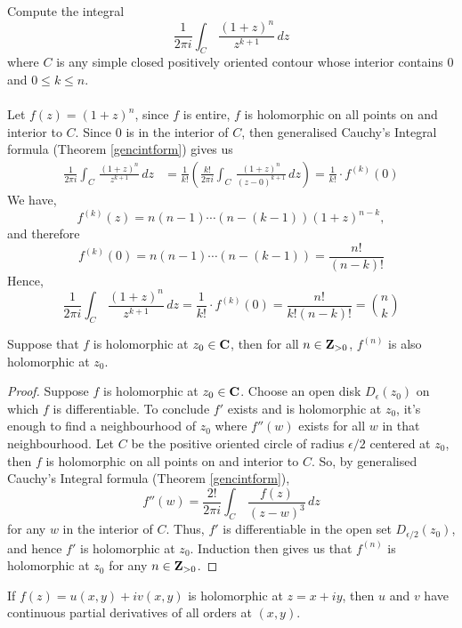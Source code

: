 \medskip

\begin{example}
Compute the integral
\[\frac{1}{2\pi i}\int_C\,\frac{(1 + z)^n}{z^{k+1}}\,dz\]
where $C$ is any simple closed positively oriented contour whose interior contains $0$ and $0 \leq k \leq n$.\\
\\
Let $f(z) = (1 + z)^n$, since $f$ is entire, $f$ is holomorphic on all points on and interior to $C$. Since $0$ is in the interior of $C$, then generalised Cauchy's Integral formula (Theorem \ref{gencintform}) gives us
\begin{align*}
\frac{1}{2\pi i}\int_C\,\frac{(1 + z)^n}{z^{k+1}}\,dz &= \frac{1}{k!}\left(\frac{k!}{2\pi i}\int_C\,\frac{(1 + z)^n}{(z - 0)^{k+1}}\,dz\right) = \frac{1}{k!}\cdot f^{(k)}(0)
\end{align*}
We have, 
\[f^{(k)}(z) = n(n-1)\cdots (n-(k-1))(1 + z)^{n-k},\]
and therefore
\[f^{(k)}(0) = n(n-1)\cdots (n-(k-1)) = \frac{n!}{(n-k)!}\]
Hence, 
\[\frac{1}{2\pi i}\int_C\,\frac{(1 + z)^n}{z^{k+1}}\,dz = \frac{1}{k!}\cdot f^{(k)}(0) = \frac{n!}{k!(n-k)!} = \binom{n}{k}\]
\end{example}

\medskip

\begin{theorem}\label{holsmooth}
Suppose that $f$ is holomorphic at $z_0 \in \mathbf C$, then for all $n\in \mathbf Z_{>0}$, $f^{(n)}$ is also holomorphic at $z_0$. 
\end{theorem}
\begin{proof}
Suppose $f$ is holomorphic at $z_0 \in \mathbf C$. Choose an open disk $D_\epsilon(z_0)$ on which $f$ is differentiable. To conclude $f'$ exists and is holomorphic at $z_0$, it's enough to find a neighbourhood of $z_0$ where $f''(w)$ exists for all $w$ in that neighbourhood. Let $C$ be the positive oriented circle of radius $\epsilon/2$ centered at $z_0$, then $f$ is holomorphic on all points on and interior to $C$. So, by generalised Cauchy's Integral formula (Theorem \ref{gencintform}),
\[f''(w) = \frac{2!}{2\pi i}\int_C\,\frac{f(z)}{(z - w)^3}\,dz\]
for any $w$ in the interior of $C$. Thus, $f'$ is differentiable in the open set $D_{\epsilon/2}(z_0)$, and hence $f'$ is holomorphic at $z_0$. Induction then gives us that $f^{(n)}$ is holomorphic at $z_0$ for any $n\in \mathbf Z_{>0}$.
\end{proof}

\medskip

\begin{corollary}
If $f(z) = u(x,y) + iv(x,y)$ is holomorphic at $z = x + iy$, then $u$ and $v$ have continuous partial derivatives of all orders at $(x,y)$. 
\end{corollary}

